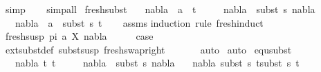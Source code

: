 \begin{isabellebody}
\ simp\isanewline
\ \ \isamarkupfalse%
\ {\isacharparenleft}{\kern0pt}simp{\isacharunderscore}{\kern0pt}all{\isacharparenright}{\kern0pt}\isanewline
{}\isamarkupfalse%
%
\endisatagproof
{\isafoldproof}%
%
\isadelimproof
\isanewline
%
\endisadelimproof
\isanewline
\isanewline
{}\isamarkupfalse%
\ fresh{\isacharunderscore}{\kern0pt}subst{\isacharcolon}{\kern0pt}\isanewline
\ \ \ {\isachardoublequoteopen}nabla{}\ {\isasymturnstile}\ a\ {\isasymsharp}\ t{\isachardoublequoteclose}\isanewline
\ \ \ \ \ {\isachardoublequoteopen}nabla{}\ {\isasymTurnstile}\ {\isacharparenleft}{\kern0pt}subst\ s{\isacharparenright}{\kern0pt}\ nabla{}{\isachardoublequoteclose}\isanewline
\ \ \ {\isachardoublequoteopen}nabla{}\ {\isasymturnstile}\ a\ {\isasymsharp}\ subst\ s\ t{\isachardoublequoteclose}\isanewline
%
\isadelimproof
\ \ %
\endisadelimproof
%
\isatagproof
{}\isamarkupfalse%
\ assms\isanewline
{}\isamarkupfalse%
{\isacharparenleft}{\kern0pt}induction\ rule{\isacharcolon}{\kern0pt}\ fresh{\isachardot}{\kern0pt}induct{\isacharparenright}{\kern0pt}\isanewline
\ \ \isamarkupfalse%
\ {\isacharparenleft}{\kern0pt}fresh{\isacharunderscore}{\kern0pt}susp\ pi\ a\ X\ nabla{\isacharparenright}{\kern0pt}\isanewline
\ \ \isamarkupfalse%
\ \isamarkupfalse%
\ {\isacharquery}{\kern0pt}case\ \isanewline
\ \ \ \ \isamarkupfalse%
\ ext{\isacharunderscore}{\kern0pt}subst{\isacharunderscore}{\kern0pt}def\ subst{\isacharunderscore}{\kern0pt}susp\ fresh{\isacharunderscore}{\kern0pt}swap{\isacharunderscore}{\kern0pt}right\ \isanewline
\ \ \ \ \isamarkupfalse%
\ auto\isanewline
{}\isamarkupfalse%
\ {\isacharparenleft}{\kern0pt}auto{\isacharparenright}{\kern0pt}%
\endisatagproof
{\isafoldproof}%
%
\isadelimproof
\isanewline
%
\endisadelimproof
\isanewline
\isanewline
{}\isamarkupfalse%
\ equ{\isacharunderscore}{\kern0pt}subst{\isacharcolon}{\kern0pt}\isanewline
\ \ \ {\isachardoublequoteopen}nabla{}{\isasymturnstile}\ t{}\ {\isasymapprox}t{}{\isachardoublequoteclose}\isanewline
\ \ \ \ \ {\isachardoublequoteopen}nabla{}\ {\isasymTurnstile}\ {\isacharparenleft}{\kern0pt}subst\ s{\isacharparenright}{\kern0pt}\ nabla{}{\isachardoublequoteclose}\isanewline
\ \ \ {\isachardoublequoteopen}nabla{}\ {\isasymturnstile}{\isacharparenleft}{\kern0pt}subst\ s\ t{}{\isacharparenright}{\kern0pt}{\isasymapprox}{\isacharparenleft}{\kern0pt}subst\ s\ t{}{\isacharparenright}{\kern0pt}{\isachardoublequoteclose}\isanewline

\end{isabellebody}
